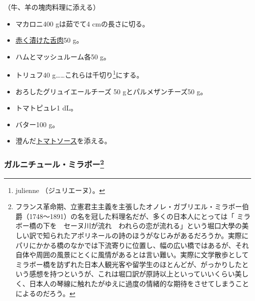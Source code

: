 \begin{recette}


（牛、羊の塊肉料理に添える）

\begin{itemize}
\item
  マカロニ400 gは茹でて4 cmの長さに切る。
\item
  \protect\hyperlink{saumure-liquide-pour-langues}{赤く漬けた舌肉}50 g。
\item
  ハムとマッシュルーム各50 g。
\item
  トリュフ40 g\ldots{}\ldots{}これらは千切り\footnote{julienne
    （ジュリエーヌ）。}にする。
\item
  おろしたグリュイエールチーズ 50 gとパルメザンチーズ50 g。
\item
  トマトピュレ1 dL。
\item
  バター100 g。
\item
  澄んだ\protect\hyperlink{sauce-tomate}{トマトソース}を添える。
\end{itemize}

\hypertarget{garniture-mirabeau}{%
\subsubsection[ガルニチュール・ミラボー]{\texorpdfstring{ガルニチュール・ミラボー\footnote{フランス革命期、立憲君主主義を主張したオノレ・ガブリエル・ミラボー伯爵（1748〜1891）の名を冠した料理名だが、多くの日本人にとっては「
  ミラボー橋の下を　セーヌ川が流れ　われらの恋が流れる」という堀口大學の美しい訳で知られたアポリネールの詩のほうがなじみがあるだろうか。実際にパリにかかる橋のなかでは下流寄りに位置し、幅の広い橋ではあるが、それ自体や周囲の風景にとくに風情があるとは言い難い。実際に文学散歩としてミラボー橋を訪ずれた日本人観光客や留学生のほとんどが、がっかりしたという感想を持つというが、これは堀口訳が原詩以上といっていいくらい美しく、日本人の琴線に触れたがゆえに過度の情緒的な期待をさせてしまうことによるのだろう。}}{ガルニチュール・ミラボー}}\label{garniture-mirabeau}}




\end{recette}
